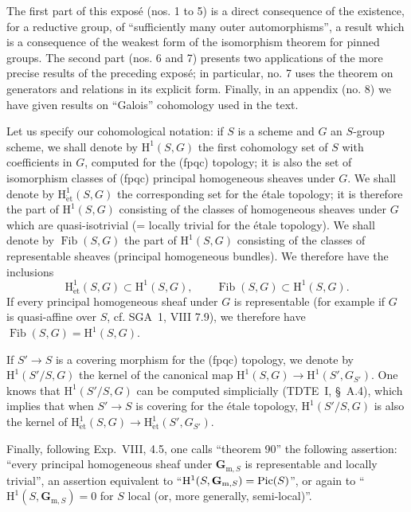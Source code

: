 \label{XXIV}
\setcounter{footnote}{-1}
The first part of this exposé (nos. 1 to 5) is a direct consequence of the existence, for a reductive group, of ``sufficiently many outer automorphisms'', a result which is a consequence of the weakest form of the isomorphism theorem for pinned groups. The second part (nos. 6 and 7) presents two applications of the more precise results of the preceding exposé; in particular, no. 7 uses the theorem on generators and relations in its explicit form. Finally, in an appendix (no. 8) we have given results on ``Galois'' cohomology used in the text.

Let us specify our cohomological notation: if $S$ is a scheme and $G$ an $S$-group scheme, we shall denote by $\mathrm H^1(S,G)$ the first cohomology set of $S$ with coefficients in $G$, computed for the (fpqc) topology; it is also the set of isomorphism classes of (fpqc) principal homogeneous sheaves under $G$. We shall denote by $\mathrm H^1_{\mathrm{\acute et}}(S,G)$ the corresponding set for the étale topology; it is therefore the part of $\mathrm H^1(S,G)$ consisting of the classes of homogeneous sheaves under $G$ which are quasi-isotrivial (= locally trivial for the étale topology). We shall denote by $\operatorname{Fib}(S,G)$ the part of $\mathrm H^1(S,G)$ consisting of the classes of representable sheaves (principal homogeneous bundles). We therefore have the inclusions
\[
\mathrm H^1_{\mathrm{\acute et}}(S,G)\subset\mathrm H^1(S,G),\qquad
\operatorname{Fib}(S,G)\subset\mathrm H^1(S,G).
\]
If every principal homogeneous sheaf under $G$ is representable (for example if $G$ is quasi-affine over $S$, cf. SGA~1, VIII 7.9), we therefore have $\operatorname{Fib}(S,G)=\mathrm H^1(S,G)$.

If $S'\to S$ is a covering morphism for the (fpqc) topology, we denote by $\mathrm H^1(S'/S,G)$ the kernel of the canonical map $\mathrm H^1(S,G)\to\mathrm H^1(S',G_{S'})$. One knows that $\mathrm H^1(S'/S,G)$ can be computed simplicially (TDTE~I, §~A.4), which implies that when $S'\to S$ is covering for the étale topology, $\mathrm H^1(S'/S,G)$ is also the kernel of $\mathrm H^1_{\mathrm{\acute et}}(S,G)\to\mathrm H^1_{\mathrm{\acute et}}(S',G_{S'})$.

Finally, following Exp.~VIII, 4.5, one calls ``theorem 90'' the following assertion: ``every principal homogeneous sheaf under $\mathbf G_{\mathrm m,S}$ is representable and locally trivial'', an assertion equivalent to ``$\mathrm H^1(S,\mathbf G_{\mathrm m,S})=\operatorname{Pic}(S)$'', or again to ``$\mathrm H^1(S,\mathbf G_{\mathrm m,S})=0$ for $S$ local (or, more generally, semi-local)''.

